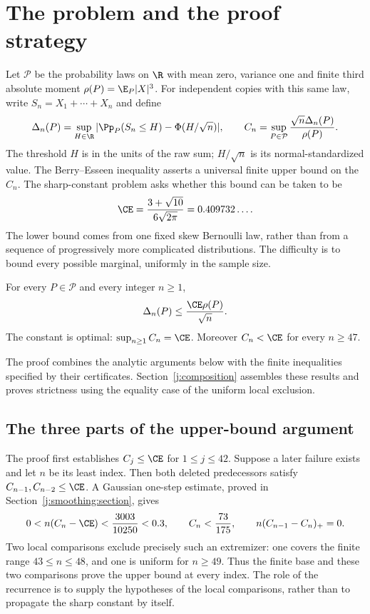 \section{The problem and the proof strategy}
\label{j:introduction}

Let $\mathcal P$ be the probability laws on $\R$ with mean zero,
variance one and finite third absolute moment $\rho(P)=\E_P|X|^3$.
For independent copies with this same law, write $S_n=X_1+\cdots+X_n$
and define
\[
 \Delta_n(P)=\sup_{H\in\R}|\Pp_P(S_n\le H)-\Phi(H/\sqrt n)|,
 \qquad C_n=\sup_{P\in\mathcal P}\frac{\sqrt n\Delta_n(P)}{\rho(P)}.
\]
The threshold $H$ is in the units of the raw sum; $H/\sqrt n$ is its
normal-standardized value. The Berry--Esseen inequality
\cite{Berry1941,Esseen1942,Esseen1945} asserts a universal finite upper
bound on the $C_n$. The sharp-constant problem asks whether this bound
can be taken to be
\[
 \CE=\frac{3+\sqrt{10}}{6\sqrt{2\pi}}=0.409732\ldots.
\]
The lower bound comes from one fixed skew Bernoulli law, rather than
from a sequence of progressively more complicated distributions.
The difficulty is to bound every possible marginal, uniformly in the
sample size.

\begin{theorem}\label{j:main}
For every $P\in\mathcal P$ and every integer $n\ge1$,
\[
 \Delta_n(P)\le\frac{\CE\rho(P)}{\sqrt n}.
\]
The constant is optimal: $\sup_{n\ge1}C_n=\CE$.
Moreover $C_n<\CE$ for every $n\ge47$.
\end{theorem}
The proof combines the analytic arguments below with the finite
inequalities specified by their certificates. Section~\ref{j:composition}
assembles these results and proves strictness using the equality case
of the uniform local exclusion.

\subsection{The three parts of the upper-bound argument}

The proof first establishes $C_j\le\CE$ for $1\le j\le42$.
Suppose a later failure exists and let $n$ be its least index. Then both
deleted predecessors satisfy $C_{n-1},C_{n-2}\le\CE$. A Gaussian
one-step estimate, proved in Section~\ref{j:smoothing:section}, gives
\[
 0<n(C_n-\CE)<\frac{3003}{10250}<0.3,\qquad
 C_n<\frac{73}{175},\qquad n(C_{n-1}-C_n)_+=0.
\]
Two local comparisons exclude precisely such an extremizer: one covers
the finite range $43\le n\le48$, and one is uniform for $n\ge49$.
Thus the finite base and these two comparisons prove the upper bound
at every index. The role of the recurrence is to supply the hypotheses
of the local comparisons, rather than to propagate the sharp constant
by itself.

